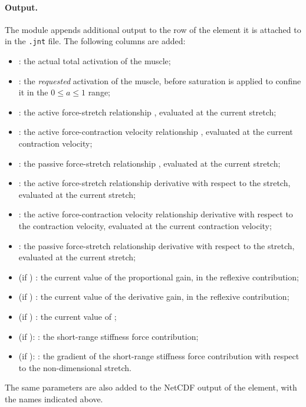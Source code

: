 \paragraph{Output.}
The module appends additional output to the row of the element it is
attached to in the \texttt{.jnt} file. The following columns are added:
\begin{itemize}
  \item {}: the actual total activation of the muscle;
  \item {}: the \emph{requested} activation of the muscle, before
    saturation is applied to confine it in the $0 \le a \le 1$ range;
  \item {}: the active force-stretch relationship \cite{PENNESTRI-2007-JB},
    evaluated at the current stretch;
  \item {}: the active force-contraction velocity relationship
    \cite{PENNESTRI-2007-JB}, evaluated at the current contraction velocity;
  \item {}: the passive force-stretch relationship \cite{PENNESTRI-2007-JB},
    evaluated at the current stretch;
  \item {}: the active force-stretch relationship derivative with respect to the
    stretch, evaluated at the current stretch;
  \item {}: the active force-contraction velocity relationship derivative
    with respect to the contraction velocity, evaluated at the current contraction
    velocity;
  \item {}: the passive force-stretch relationship derivative with respect to the
    stretch, evaluated at the current stretch;
  \item (if ) : the current value of the proportional gain, in the
    reflexive contribution;
  \item (if ) : the current value of the derivative gain, in the
    reflexive contribution;
  \item (if ) : the current value of ;
  \item (if ): : the short-range stiffness force contribution;
  \item (if ): : the gradient of the short-range
    stiffness force contribution with respect to the non-dimensional stretch.
\end{itemize}
The same parameters are also added to the NetCDF output of the element, with the names indicated above.

